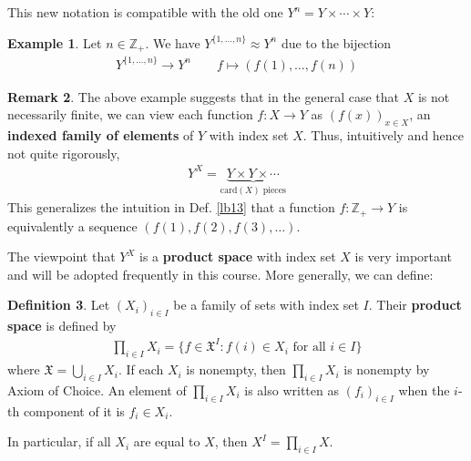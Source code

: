 \documentclass[12pt,b5paper,notitlepage]{article}
\theoremstyle{definition}
\newtheorem{df}{Definition}[section]
\newtheorem{eg}[df]{Example}
\newtheorem{rem}[df]{Remark}
\theoremstyle{plain}
\newcommand{\fk}{\mathfrak}
\newcommand{\Zbb}{\mathbb Z}
\newcommand{\card}{\mathrm{card}}
\numberwithin{equation}{section}
\begin{document}
This new notation is compatible with the old one $Y^n=Y\times\cdots\times Y$:
\begin{eg}
Let $n\in\Zbb_+$. We have $Y^{\{1,\dots,n\}}\approx Y^n$ due to the bijection
\begin{align*}
Y^{\{1,\dots,n\}}\rightarrow Y^n\qquad f\mapsto (f(1),\dots,f(n))
\end{align*}
\end{eg}

\begin{rem}\label{lb18}
The above example suggests that in the general case that $X$ is not necessarily finite, we can view each function $f:X\rightarrow Y$ as $(f(x))_{x\in X}$, an \textbf{indexed family of elements} of $Y$ with index set $X$. Thus, intuitively and hence not quite rigorously, 
\begin{align}
Y^X=\underbrace{Y\times Y\times\cdots}_{\card(X)\text{ pieces}} \label{eq11}
\end{align}
This generalizes the intuition in Def. \ref{lb13} that a function $f:\Zbb_+\rightarrow Y$ is equivalently a sequence $(f(1),f(2),f(3),\dots)$.

The viewpoint that $Y^X$ is a \textbf{product space} with index set $X$ is very important and will be adopted frequently in this course. More generally, we can define:\hfill\qedsymbol
\end{rem}

\begin{df}
Let $(X_i)_{i\in I}$ be a family of sets with index set $I$. Their \textbf{product space}   is defined by
\begin{align*}
\prod_{i\in I}X_i =\{f\in \fk X^I:f(i)\in X_i\text{ for all }i\in I \}
\end{align*}
where $\fk X=\bigcup_{i\in I}X_i$. If each $X_i$ is nonempty, then $\prod_{i\in I}X_i$ is nonempty by Axiom of Choice. An element of $\prod_{i\in I}X_i$ is also written as $(f_i)_{i\in I}$ when the $i$-th component of it is $f_i\in X_i$.
\end{df}

In particular, if all $X_i$ are equal to $X$, then $X^I=\prod_{i\in I}X$.
\end{document}
